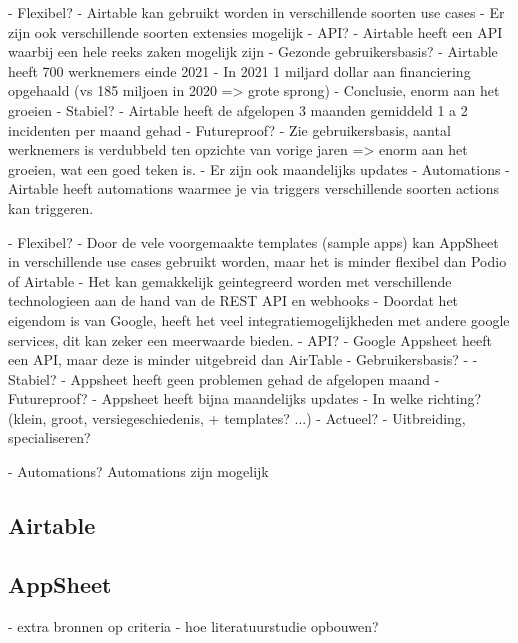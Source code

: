 - Flexibel? 
    - Airtable kan gebruikt worden in verschillende soorten use cases %
    - Er zijn ook verschillende soorten extensies mogelijk %
- API? 
    - Airtable heeft een API waarbij een hele reeks zaken mogelijk zijn %
- Gezonde gebruikersbasis?
    - Airtable heeft 700 werknemers einde 2021
    - In 2021 1 miljard dollar aan financiering opgehaald (vs 185 miljoen in 2020 => grote sprong)
    - Conclusie, enorm aan het groeien %
 - Stabiel?
    - Airtable heeft de afgelopen 3 maanden gemiddeld 1 a 2 incidenten per maand gehad
 - Futureproof?
    - Zie gebruikersbasis, aantal werknemers is verdubbeld ten opzichte van vorige jaren => enorm aan het groeien, wat een goed teken is.
    - Er zijn ook maandelijks updates %
- Automations
    -  Airtable heeft automations waarmee je via triggers verschillende soorten actions kan triggeren. %

- Flexibel?
    - Door de vele voorgemaakte templates (sample apps) kan AppSheet in verschillende use cases gebruikt worden, maar het is minder flexibel dan Podio of Airtable
    - Het kan gemakkelijk geintegreerd worden met verschillende technologieen aan de hand van de REST API en webhooks %
    - Doordat het eigendom is van Google, heeft het veel integratiemogelijkheden met andere google services, dit kan zeker een meerwaarde bieden.
- API? 
    - Google Appsheet heeft een API, maar deze is minder uitgebreid dan AirTable %
- Gebruikersbasis?
    - 
- Stabiel?
    - Appsheet heeft geen problemen gehad de afgelopen maand %
- Futureproof?
    - Appsheet heeft bijna maandelijks updates  %
    - In welke richting? (klein, groot, versiegeschiedenis, + templates? ...)
    - Actueel?
    - Uitbreiding, specialiseren?
    
- Automations? 
    Automations zijn mogelijk
\subsection{Airtable}

\subsection{AppSheet}

- extra bronnen op criteria
- hoe literatuurstudie opbouwen?